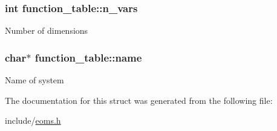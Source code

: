 \subsubsection[{n\+\_\+vars}]{\setlength{\rightskip}{0pt plus 5cm}int function\+\_\+table\+::n\+\_\+vars}\label{structfunction__table_ae4e3f9023fbce759fc423e921e51d43f}
Number of dimensions \hypertarget{structfunction__table_a99650448c98f34476adf6caf60a22df2}{}
\subsubsection[{name}]{\setlength{\rightskip}{0pt plus 5cm}char$\ast$ function\+\_\+table\+::name}\label{structfunction__table_a99650448c98f34476adf6caf60a22df2}
Name of system 

The documentation for this struct was generated from the following file\+:\begin{DoxyCompactItemize}
\item 
include/\hyperlink{eoms_8h}{eoms.\+h}\end{DoxyCompactItemize}
